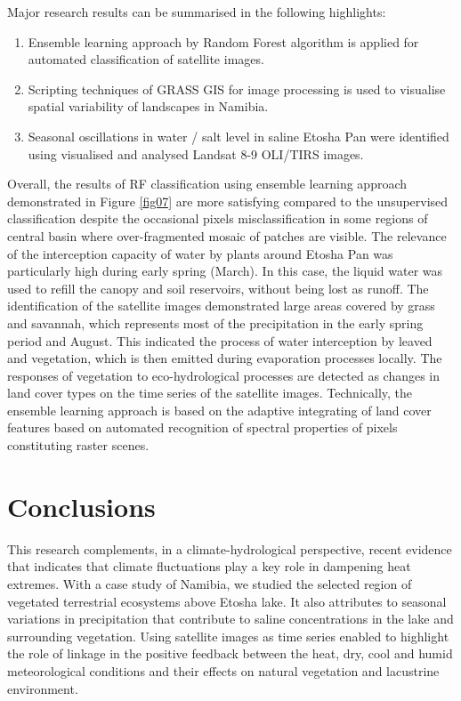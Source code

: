 \documentclass[climate,article,submit,pdftex,moreauthors]{Definitions/mdpi}
\begin{document}
Major research results can be summarised in the following highlights: 
\begin{enumerate}
\item Ensemble learning approach by Random Forest algorithm is applied for automated classification of satellite images. 
\item Scripting techniques of GRASS GIS for image processing is used to visualise spatial variability of landscapes in Namibia.
\item Seasonal oscillations in water / salt level in saline Etosha Pan were identified using visualised and analysed Landsat 8-9 OLI/TIRS images.
\end{enumerate}

Overall, the results of RF classification using ensemble learning approach demonstrated in Figure \ref{fig07} are more satisfying compared to the unsupervised classification despite the occasional pixels misclassification in some regions of central basin where over-fragmented mosaic of patches are visible. {The relevance of the interception capacity of water by plants around Etosha Pan was particularly high during early spring (March). In this case, the liquid water was used to refill the canopy and soil reservoirs, without being lost as runoff. The identification of the satellite images demonstrated large areas covered by grass and savannah, which represents most of the precipitation in the early spring period and August. This indicated the process of water interception by leaved and vegetation, which is then emitted during evaporation processes locally. The responses of vegetation to eco-hydrological processes are detected as changes in land cover types on the time series of the satellite images. Technically, the} ensemble learning approach is based on the adaptive integrating of land cover features based on automated recognition of spectral properties of pixels constituting raster scenes. 

\section{Conclusions}

{This research complements, in a climate-hydrological perspective, recent evidence that indicates that climate fluctuations play a key role in dampening heat extremes. With a case study of Namibia, we studied the selected region of vegetated terrestrial ecosystems above Etosha lake. It also attributes to seasonal variations in precipitation that contribute to saline concentrations in the lake and surrounding vegetation. Using satellite images as time series enabled to highlight the role of linkage in the positive feedback between the heat, dry, cool and humid meteorological conditions and their effects on natural vegetation and lacustrine environment. }
\end{document}
